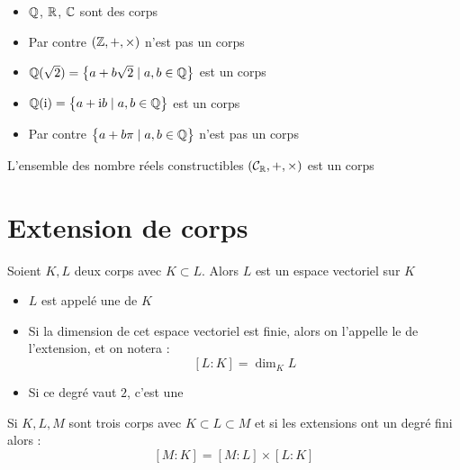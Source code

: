 \begin{frame}


\pause

\begin{itemize}
  \item $\mathbb{Q}$, $\mathbb{R}$, $\mathbb{C}$ sont des corps
  \pause
  \item Par contre $(\mathbb{Z},+,\times)$ n'est pas un corps
\pause
 \item $\mathbb{Q}(\sqrt 2) = \big\{ a+b\sqrt 2 \mid a,b \in \mathbb{Q} \big\}$ est un corps
 \pause
 \item  $\mathbb{Q}(\mathrm{i}) =  \big\{ a+\mathrm{i} b \mid a,b \in \mathbb{Q}  \big\}$ est un corps
\pause
 \item Par contre  $ \big\{ a+b \pi \mid a,b \in \mathbb{Q}  \big\}$ n'est pas un corps
\end{itemize}

\pause
\medskip

\begin{proposition}
L'ensemble des nombre réels constructibles $(\mathcal{C}_{\mathbb{R}}, +, \times)$ est un corps
\end{proposition}

\end{frame}





\section{Extension de corps}

\begin{frame}

\begin{proposition}
Soient $K, L$ deux corps avec $K \subset L$. 
Alors $L$ est un espace vectoriel sur $K$
\end{proposition}

\pause

\begin{mydefinition}
\begin{itemize}
  \item $L$ est appelé une  de $K$
  \pause
  \item Si la dimension de cet espace vectoriel est finie, alors
on l'appelle le  de l'extension, et on notera :
\vspace*{-2ex}
$$[L:K] = \dim_K L$$
\vspace*{-5ex} 
\pause
  \item Si ce degré vaut $2$, c'est une 
\end{itemize}
\end{mydefinition}

\pause

\begin{proposition}
\label{prop:KLM}
Si $K,L,M$ sont trois corps avec $K \subset L \subset M$
et si les extensions ont un degré fini alors :
\vspace*{-1ex}
$$[M:K] = [M:L] \times [L:K]$$
\end{proposition}

\end{frame}


